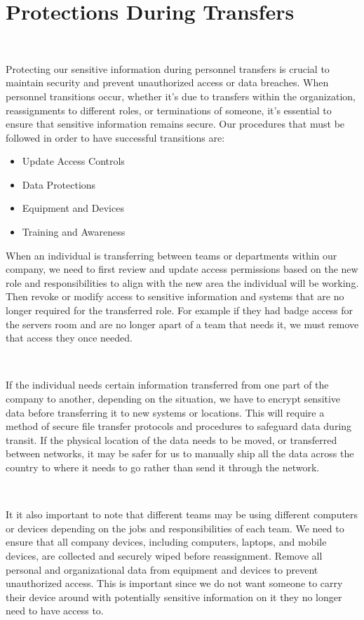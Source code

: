 \documentclass[12pt,a4paper]{report}
\begin{document}
\section{Protections During Transfers}
\

Protecting our sensitive information during personnel transfers is crucial to maintain security and prevent unauthorized access or data breaches.
When personnel transitions occur, whether it's due to transfers within the organization, reassignments to different roles, or terminations of someone, it's essential to ensure that sensitive information remains secure.
Our procedures that must be followed in order to have successful transitions are:
\begin{itemize}
 \item Update Access Controls
 \item Data Protections
 \item Equipment and Devices
 \item Training and Awareness
\end{itemize}

When an individual is transferring between teams or departments within our company, we need to first review and update access permissions based on the new role and responsibilities to align with the new area the individual will be working.
Then revoke or modify access to sensitive information and systems that are no longer required for the transferred role.
For example if they had badge access for the servers room and are no longer apart of a team that needs it, we must remove that access they once needed.

\

If the individual needs certain information transferred from one part of the company to another, depending on the situation, we have to encrypt sensitive data before transferring it to new systems or locations.
This will require a method of secure file transfer protocols and procedures to safeguard data during transit.
If the physical location of the data needs to be moved, or transferred between networks, it may be safer for us to manually ship all the data across the country to where it needs to go rather than send it through the network.

\

It it also important to note that different teams may be using different computers or devices depending on the jobs and responsibilities of each team. 
We need to ensure that all company devices, including computers, laptops, and mobile devices, are collected and securely wiped before reassignment.
Remove all personal and organizational data from equipment and devices to prevent unauthorized access.
This is important since we do not want someone to carry their device around with potentially sensitive information on it they no longer need to have access to.
\end{document}
